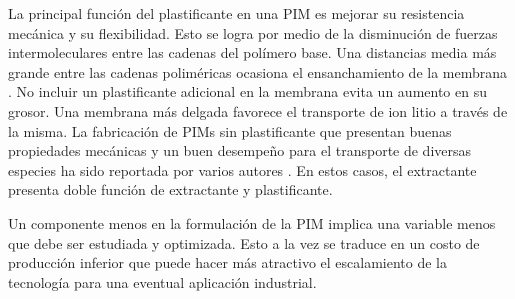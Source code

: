 La principal función del plastificante en una PIM es mejorar su resistencia mecánica y su flexibilidad. Esto se logra por medio de la disminución de fuerzas intermoleculares entre las cadenas del polímero base. Una distancias media más grande entre las cadenas poliméricas ocasiona el ensanchamiento de la membrana \citep{Witt2018}. No incluir un plastificante adicional en la membrana evita un aumento en su grosor. Una membrana más delgada favorece el transporte de ion litio a través de la misma. La fabricación de PIMs sin plastificante que presentan buenas propiedades mecánicas y un buen desempeño para el transporte de diversas especies ha sido reportada por varios autores \citep{Vazquez2014, Xiong2019}. En estos casos, el extractante presenta doble función de extractante y plastificante.


Un componente menos en la formulación de la PIM implica una variable menos que debe ser estudiada y optimizada. Esto a la vez se traduce en un costo de producción inferior que puede hacer más atractivo el escalamiento de la tecnología para una eventual aplicación industrial.

